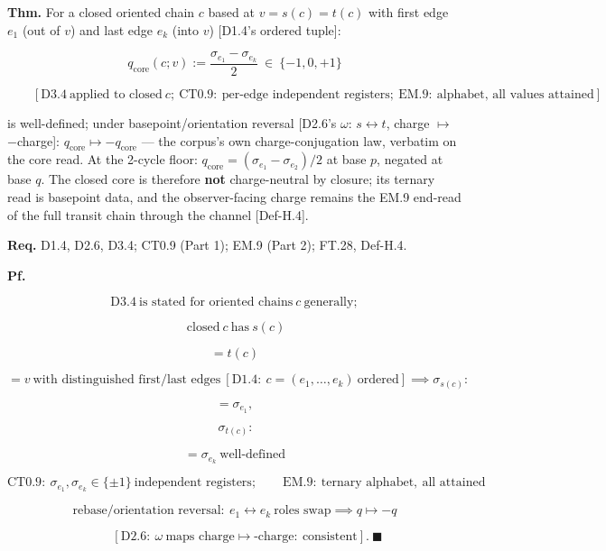 \begin{theorem}\label{tag:FT-40}
\textbf{Thm.} For a closed oriented chain $c$ based at $v=s(c)=t(c)$ with first edge $e_1$ (out of $v$) and last edge $e_k$ (into $v$) [D1.4's ordered tuple]:

\[
q_{\mathrm{core}}(c;v):=\frac{\sigma_{e_1}-\sigma_{e_k}}{2}\ \in\ \{-1,0,+1\}
\]

\[
\qquad [\mathrm{D3.4}\ \text{applied to closed}\ c;\ \mathrm{CT0.9}:\ \text{per-edge independent registers};\ \mathrm{EM.9}:\ \text{alphabet, all values attained}]
\]

is well-defined; under basepoint/orientation reversal [D2.6's $\omega$: $s\leftrightarrow t$, charge $\mapsto$ $-$charge]: $q_{\mathrm{core}}\mapsto-q_{\mathrm{core}}$ — the corpus's own charge-conjugation law, verbatim on the core read. At the 2-cycle floor: $q_{\mathrm{core}}=(\sigma_{e_1}-\sigma_{e_2})/2$ at base $p$, negated at base $q$. The closed core is therefore \textbf{not} charge-neutral by closure; its ternary read is basepoint data, and the observer-facing charge remains the EM.9 end-read of the full transit chain through the channel [Def-H.4].

\textbf{Req.} D1.4, D2.6, D3.4; CT0.9 (Part 1); EM.9 (Part 2); FT.28, Def-H.4.

\textbf{Pf.}

\[
\mathrm{D3.4}\ \text{is stated for oriented chains}\ c\ \text{generally};
\]

\[
\ \text{closed}\ c\ \text{has}\ s(c)
\]

\[
= t(c)
\]

\[
= v\ \text{with distinguished first/last edges}\ [\mathrm{D1.4}:\ c=(e_1,\dots,e_k)\ \text{ordered}]\implies\sigma_{s(c)}:
\]

\[
= \sigma_{e_1},
\]

\[
\ \sigma_{t(c)}:
\]

\[
= \sigma_{e_k}\ \text{well-defined}
\]

\[
\mathrm{CT0.9}:\ \sigma_{e_1},\sigma_{e_k}\in\{\pm1\}\ \text{independent registers};\qquad\mathrm{EM.9}:\ \text{ternary alphabet},\ \text{all attained}
\]

\[
\text{rebase/orientation reversal}:\ e_1\leftrightarrow e_k\ \text{roles swap}\implies q\mapsto-q
\]

\[
\qquad [\mathrm{D2.6}:\ \omega\ \text{maps charge}\mapsto\text{-charge}:\ \text{consistent}].\ \blacksquare
\]


\end{theorem}
